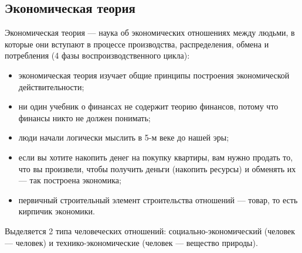\documentclass{article}
\begin{document}
\subsection{Экономическая теория}
Экономическая теория --- наука об экономических отношениях между людьми, 
в которые они вступают в процессе производства, распределения, обмена и потребления (4 фазы воспроизводственного цикла):
\begin{itemize}
    \item экономическая теория изучает общие принципы построения экономической действительности;
    \item ни один учебник о финансах не содержит теорию финансов, потому что финансы никто не должен понимать;
    \item люди начали логически мыслить в 5-м веке до нашей эры;
    \item если вы хотите накопить денег на покупку квартиры, вам нужно продать то, что вы произвели, 
          чтобы получить деньги (накопить ресурсы) и обменять их --- так построена экономика;
    \item первичный строительный элемент строительства отношений --- товар, то есть кирпичик экономики.
\end{itemize}

Выделяется 2 типа человеческих отношений: социально-экономический (человек --- человек) 
и технико-экономические (человек --- вещество природы).
\end{document}

